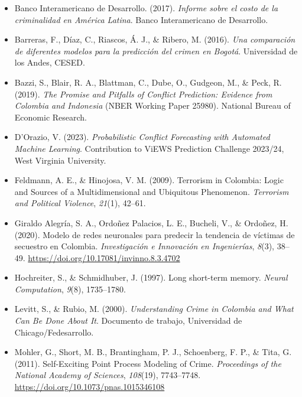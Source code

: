 \documentclass[12pt]{article}
\begin{document}
\begin{itemize}
    \item Banco Interamericano de Desarrollo. (2017). \textit{Informe sobre el costo de la criminalidad en América Latina}. Banco Interamericano de Desarrollo.
    
    \item Barreras, F., Díaz, C., Riascos, Á. J., \& Ribero, M. (2016). \textit{Una comparación de diferentes modelos para la predicción del crimen en Bogotá}. Universidad de los Andes, CESED.
    
    \item Bazzi, S., Blair, R. A., Blattman, C., Dube, O., Gudgeon, M., \& Peck, R. (2019). \textit{The Promise and Pitfalls of Conflict Prediction: Evidence from Colombia and Indonesia} (NBER Working Paper 25980). National Bureau of Economic Research.
    
    \item D'Orazio, V. (2023). \textit{Probabilistic Conflict Forecasting with Automated Machine Learning}. Contribution to ViEWS Prediction Challenge 2023/24, West Virginia University. 
    
    \item Feldmann, A. E., \& Hinojosa, V. M. (2009). Terrorism in Colombia: Logic and Sources of a Multidimensional and Ubiquitous Phenomenon. \textit{Terrorism and Political Violence}, \textit{21}(1), 42--61.
    
    \item Giraldo Alegría, S. A., Ordoñez Palacios, L. E., Bucheli, V., \& Ordoñez, H. (2020). Modelo de redes neuronales para predecir la tendencia de víctimas de secuestro en Colombia. \textit{Investigación e Innovación en Ingenierías}, \textit{8}(3), 38--49. \url{https://doi.org/10.17081/invinno.8.3.4702}
    
    \item Hochreiter, S., \& Schmidhuber, J. (1997). Long short-term memory. \textit{Neural Computation}, \textit{9}(8), 1735--1780.
    
    \item Levitt, S., \& Rubio, M. (2000). \textit{Understanding Crime in Colombia and What Can Be Done About It}. Documento de trabajo, Universidad de Chicago/Fedesarrollo.
    
    \item Mohler, G., Short, M. B., Brantingham, P. J., Schoenberg, F. P., \& Tita, G. (2011). Self-Exciting Point Process Modeling of Crime. \textit{Proceedings of the National Academy of Sciences}, \textit{108}(19), 7743--7748. \url{https://doi.org/10.1073/pnas.1015346108}
    

\end{itemize}
\end{document}
